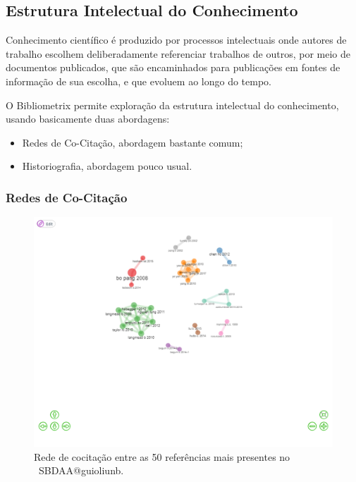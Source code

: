 \subsection{Estrutura Intelectual  do Conhecimento}

Conhecimento científico é produzido por processos intelectuais onde autores de trabalho escolhem deliberadamente referenciar trabalhos de outros, por meio de documentos publicados, que são encaminhados para publicações em fontes de informação de sua escolha, e que evoluem ao longo do tempo.

O Bibliometrix permite exploração da estrutura intelectual do conhecimento, usando basicamente duas abordagens:
\begin{itemize}
    \item Redes de Co-Citação, abordagem bastante comum;
    \item Historiografia, abordagem pouco usual.
\end{itemize}

\subsubsection{Redes de Co-Citação}

\begin{figure}
    \centering
    \includegraphics[width=1\textwidth]{experiments/guioliunb/AnaliseBibliometrica/SocialBigDataAnalysis/CO CITATION NETWORK.png}
    \caption{Rede de cocitação entre as 50 referências mais presentes no  \dataset\ SBDAA@guioliunb.}
    \label{fig:MASSA2-CoCitation-Network}
\end{figure}

